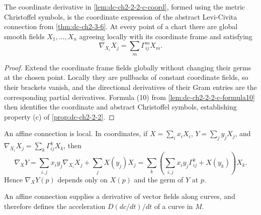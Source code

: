 \begin{lemma}
  \label{lem:dc-ch2-2-2-c-bridge}
  \leanok
  The coordinate derivative in \cref{lem:dc-ch2-2-2-c-coord}, formed using the
  metric Christoffel symbols, is the coordinate expression of the abstract
  Levi-Civita connection from \cref{thm:dc-ch2-3-6}. At every point of a chart
  there are global smooth fields $X_1,\dots,X_n$ agreeing locally with its
  coordinate frame and satisfying
  \[
    \nabla_{X_i}X_j=\sum_m\Gamma^m_{ij}X_m.
  \]
  \end{lemma}
\begin{proof}
    \leanok
    \sketch
    Extend the coordinate frame fields globally without changing their germs at
    the chosen point. Locally they are pullbacks of constant coordinate fields,
    so their brackets vanish, and the directional derivatives of their Gram
    entries are the corresponding partial derivatives. Formula (10) from
    \cref{lem:dc-ch2-2-2-c-formula10} then identifies the coordinate and abstract
    Christoffel symbols, establishing property (c) of
    \cref{prop:dc-ch2-2-2}.
  \end{proof}

\begin{remark}[Remark 2.3]
  \label{rem:dc-ch2-2-3}
  \leanok
  An affine connection is local. In coordinates, if
  $X=\sum_ix_iX_i$, $Y=\sum_jy_jX_j$, and
  $\nabla_{X_i}X_j=\sum_k\Gamma_{ij}^kX_k$, then
  \[
    \nabla_XY
      =\sum_{i,j}x_iy_j\nabla_{X_i}X_j+\sum_jX(y_j)X_j
      =\sum_k\left(\sum_{i,j}x_iy_j\Gamma_{ij}^k+X(y_k)\right)X_k.
  \]
  Hence $\nabla_XY(p)$ depends only on $X(p)$ and the germ of $Y$ at $p$.
\end{remark}

\begin{remark}[Remark 2.4]
  \label{rem:dc-ch2-2-4}
  \leanok
  An affine connection supplies a derivative of vector fields along curves, and
  therefore defines the acceleration $D(dc/dt)/dt$ of a curve in $M$.
\end{remark}

